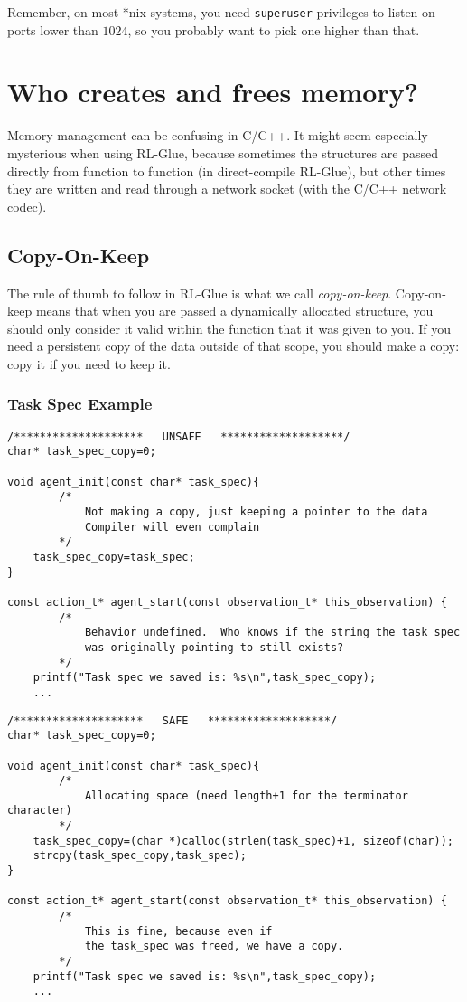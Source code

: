 \documentclass[11pt]{article}
\begin{document}
Remember, on most *nix systems, you need \texttt{superuser} privileges to listen on ports lower than $1024$, so you probably want to pick one higher than that.


\section{Who creates and frees memory?}
Memory management can be confusing in C/C++.  It might seem especially mysterious when using RL-Glue, because sometimes the structures are passed directly 
from function to function (in direct-compile RL-Glue), but other times they are written and read through a network socket (with the C/C++ network codec).

\subsection{Copy-On-Keep}
The rule of thumb to follow in RL-Glue is what we call \textit{copy-on-keep}.  Copy-on-keep means that when you are passed a dynamically allocated structure, you should
only consider it valid within the function that it was given to you.  If you need a persistent copy of the data outside of that scope, you should make a copy: copy it if you
need to keep it.

\subsubsection{Task Spec Example}
\begin{verbatim}
/********************   UNSAFE   *******************/
char* task_spec_copy=0;
	
void agent_init(const char* task_spec){
        /*
            Not making a copy, just keeping a pointer to the data
            Compiler will even complain 
        */
    task_spec_copy=task_spec;
}

const action_t* agent_start(const observation_t* this_observation) {
        /*
            Behavior undefined.  Who knows if the string the task_spec
            was originally pointing to still exists?
        */
    printf("Task spec we saved is: %s\n",task_spec_copy);
    ...
\end{verbatim}

\begin{verbatim}
/********************   SAFE   *******************/
char* task_spec_copy=0;
	
void agent_init(const char* task_spec){
        /*
            Allocating space (need length+1 for the terminator character)
        */
    task_spec_copy=(char *)calloc(strlen(task_spec)+1, sizeof(char));
    strcpy(task_spec_copy,task_spec);
}

const action_t* agent_start(const observation_t* this_observation) {
        /*
            This is fine, because even if 
            the task_spec was freed, we have a copy.
        */
    printf("Task spec we saved is: %s\n",task_spec_copy);
    ...
\end{verbatim}
\end{document}
